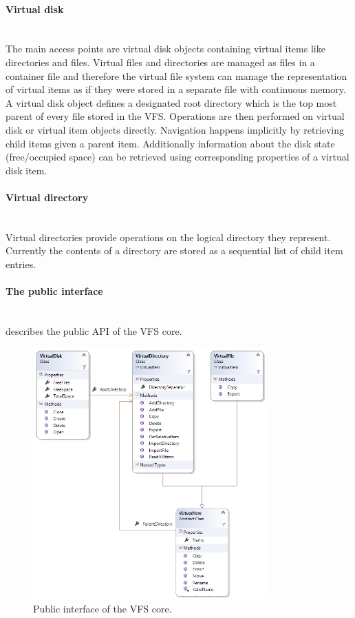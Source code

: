 \documentclass{scrartcl}
\begin{document}
\paragraph{Virtual disk} \ \\
The main access points are virtual disk objects containing virtual items like directories and files.
Virtual files and directories are managed as files in a container file and
therefore the virtual file system can manage the representation of virtual
items as if they were stored in a separate file with continuous memory.
A virtual disk object defines a designated root directory which is the top most
parent of every file stored in the VFS.
Operations are then performed on virtual disk or virtual item objects directly.
Navigation happens implicitly by retrieving child items given a parent item.
Additionally information about the disk state (free/occupied space) can be
retrieved using corresponding properties of a virtual disk item.

\paragraph{Virtual directory} \ \\
Virtual directories provide operations on the logical directory they represent. Currently the contents of a directory are stored as a sequential list of child item entries.

\paragraph{The public interface} \ \\
 describes the public API of the VFS core.
\begin{figure}[h]
    \centering
        \includegraphics[width=0.8\textwidth]{figures/PublicInterfaceVFSCore}
        \caption{Public interface of the VFS core.}
        \label{fig:coreapi}
\end{figure}
\end{document}
